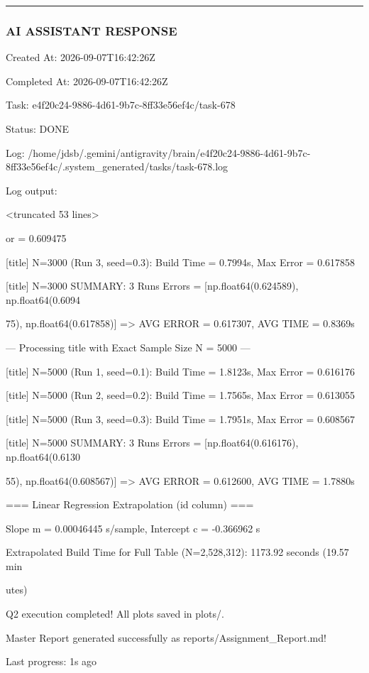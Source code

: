 \documentclass[11pt,a4paper]{article}
\begin{document}
\hrule

\subsubsection{AI ASSISTANT RESPONSE}

Created At: 2026-09-07T16:42:26Z

Completed At: 2026-09-07T16:42:26Z

Task: e4f20c24-9886-4d61-9b7c-8ff33e56ef4c/task-678

Status: DONE

Log: /home/jdsb/.gemini/antigravity/brain/e4f20c24-9886-4d61-9b7c-8ff33e56ef4c/.system\_generated/tasks/task-678.log

Log output:

<truncated 53 lines>

or = 0.609475

[title] N=3000 (Run 3, seed=0.3): Build Time = 0.7994s, Max Error = 0.617858

[title] N=3000 SUMMARY: 3 Runs Errors = [np.float64(0.624589), np.float64(0.6094

75), np.float64(0.617858)] => AVG ERROR = 0.617307, AVG TIME = 0.8369s

--- Processing title with Exact Sample Size N = 5000 ---

[title] N=5000 (Run 1, seed=0.1): Build Time = 1.8123s, Max Error = 0.616176

[title] N=5000 (Run 2, seed=0.2): Build Time = 1.7565s, Max Error = 0.613055

[title] N=5000 (Run 3, seed=0.3): Build Time = 1.7951s, Max Error = 0.608567

[title] N=5000 SUMMARY: 3 Runs Errors = [np.float64(0.616176), np.float64(0.6130

55), np.float64(0.608567)] => AVG ERROR = 0.612600, AVG TIME = 1.7880s

=== Linear Regression Extrapolation (id column) ===

Slope m = 0.00046445 s/sample, Intercept c = -0.366962 s

Extrapolated Build Time for Full Table (N=2,528,312): 1173.92 seconds (19.57 min

utes)

Q2 execution completed! All plots saved in plots/.

Master Report generated successfully as reports/Assignment\_Report.md!


Last progress: 1s ago
\end{document}
